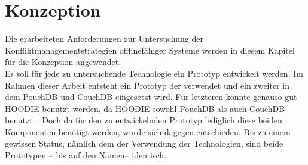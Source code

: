 \chapter{\label{chap:konzeption}Konzeption}
Die erarbeiteten Anforderungen zur Untersuchung der Konfliktmanagementstrategien offlinefähiger Systeme werden in diesem Kapitel für die Konzeption angewendet.\\
Es soll für jede zu untersuchende Technologie ein Prototyp entwickelt werden. Im Rahmen dieser Arbeit entsteht ein Prototyp der  verwendet und ein zweiter in dem PouchDB und CouchDB eingesetzt wird. Für letzteren könnte genauso gut HOODIE benutzt werden, da HOODIE sowohl PouchDB als auch CouchDB benutzt~\cite{hoodie-how}.
Doch da für den zu entwickelnden Prototyp lediglich diese beiden Komponenten benötigt werden, wurde sich dagegen entschieden.
Bis zu einem gewissen Status, nämlich dem der Verwendung der Technologien, sind beide Prototypen -- bis auf den Namen-- identisch.
%
%
